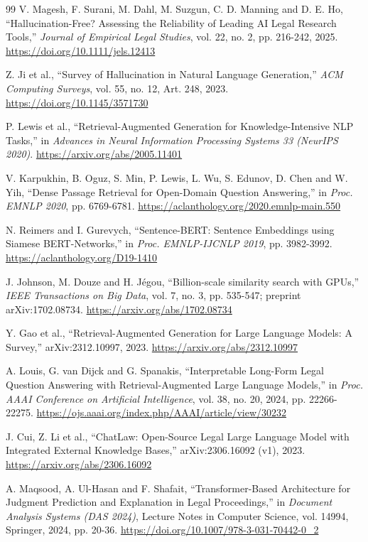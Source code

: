 \begin{thebibliography}{99}
 V. Magesh, F. Surani, M. Dahl, M. Suzgun, C. D. Manning and D. E. Ho, ``Hallucination-Free? Assessing the Reliability of Leading AI Legal Research Tools,'' \emph{Journal of Empirical Legal Studies}, vol. 22, no. 2, pp. 216-242, 2025. \url{https://doi.org/10.1111/jels.12413}

 Z. Ji et al., ``Survey of Hallucination in Natural Language Generation,'' \emph{ACM Computing Surveys}, vol. 55, no. 12, Art. 248, 2023. \url{https://doi.org/10.1145/3571730}

 P. Lewis et al., ``Retrieval-Augmented Generation for Knowledge-Intensive NLP Tasks,'' in \emph{Advances in Neural Information Processing Systems 33 (NeurIPS 2020)}. \url{https://arxiv.org/abs/2005.11401}

 V. Karpukhin, B. Oguz, S. Min, P. Lewis, L. Wu, S. Edunov, D. Chen and W. Yih, ``Dense Passage Retrieval for Open-Domain Question Answering,'' in \emph{Proc. EMNLP 2020}, pp. 6769-6781. \url{https://aclanthology.org/2020.emnlp-main.550}

 N. Reimers and I. Gurevych, ``Sentence-BERT: Sentence Embeddings using Siamese BERT-Networks,'' in \emph{Proc. EMNLP-IJCNLP 2019}, pp. 3982-3992. \url{https://aclanthology.org/D19-1410}

 J. Johnson, M. Douze and H. Jégou, ``Billion-scale similarity search with GPUs,'' \emph{IEEE Transactions on Big Data}, vol. 7, no. 3, pp. 535-547; preprint arXiv:1702.08734. \url{https://arxiv.org/abs/1702.08734}

 Y. Gao et al., ``Retrieval-Augmented Generation for Large Language Models: A Survey,'' arXiv:2312.10997, 2023. \url{https://arxiv.org/abs/2312.10997}

 A. Louis, G. van Dijck and G. Spanakis, ``Interpretable Long-Form Legal Question Answering with Retrieval-Augmented Large Language Models,'' in \emph{Proc. AAAI Conference on Artificial Intelligence}, vol. 38, no. 20, 2024, pp. 22266-22275. \url{https://ojs.aaai.org/index.php/AAAI/article/view/30232}

 J. Cui, Z. Li et al., ``ChatLaw: Open-Source Legal Large Language Model with Integrated External Knowledge Bases,'' arXiv:2306.16092 (v1), 2023. \url{https://arxiv.org/abs/2306.16092}

 A. Maqsood, A. Ul-Hasan and F. Shafait, ``Transformer-Based Architecture for Judgment Prediction and Explanation in Legal Proceedings,'' in \emph{Document Analysis Systems (DAS 2024)}, Lecture Notes in Computer Science, vol. 14994, Springer, 2024, pp. 20-36. \url{https://doi.org/10.1007/978-3-031-70442-0_2}


\end{thebibliography}
